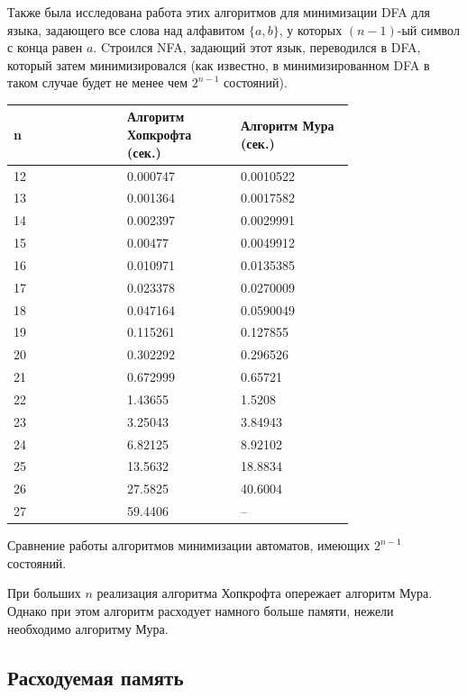 \documentclass{article}
\begin{document}
Также была исследована работа этих алгоритмов для минимизации DFA для языка, задающего все слова над алфавитом $\{a, b\}$, у которых $(n - 1)$-ый символ с конца равен $a$. Cтроился NFA, задающий этот язык, переводился в DFA, который затем минимизировался (как известно, в минимизированном DFA в таком случае будет не менее чем $2^{n-1}$ состояний). 


  \setlength{\arrayrulewidth}{0.5mm}
  \setlength{\tabcolsep}{18pt}
  \begin{tabular}{|m{0.25\linewidth}|m{0.25\linewidth}|m{0.25\linewidth}|}
  \hline
  \centering n & \centering Алгоритм Хопкрофта (сек.) &  Алгоритм Мура (сек.)\\
  \hline
  
  12 & 0.000747 & 0.0010522\\
  \hline
  13 & 0.001364 & 0.0017582\\
  \hline
  14 & 0.002397 & 0.0029991\\
  \hline
  15 & 0.00477 & 0.0049912\\
  \hline
  16 & 0.010971 & 0.0135385\\
  \hline
  17 & 0.023378 & 0.0270009\\
  \hline
  18 & 0.047164 & 0.0590049\\
  \hline
  19 & 0.115261 & 0.127855\\
  \hline
  20 & 0.302292 & 0.296526\\
  \hline
  21 & 0.672999 & 0.65721\\
  \hline
  22 & 1.43655 & 1.5208\\
  \hline
  23 & 3.25043 & 3.84943\\
  \hline
  24 & 6.82125 & 8.92102\\
  \hline
  25 & 13.5632 & 18.8834\\
  \hline
  26 & 27.5825 & 40.6004\\
  \hline
  27 & 59.4406 & -- \\
  \hline
  \end{tabular}
  \begin{center}
  Сравнение работы алгоритмов минимизации автоматов, имеющих $2^{n-1}$ состояний.
  \end{center}

При больших $n$ реализация алгоритма Хопкрофта опережает алгоритм Мура. Однако при этом алгоритм расходует намного больше памяти, нежели необходимо алгоритму Мура.

\subsection{Расходуемая память}
\end{document}
